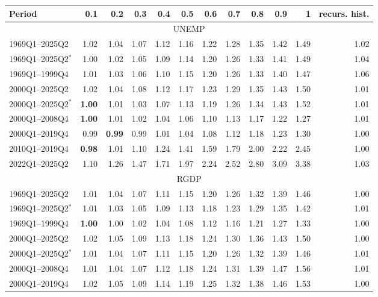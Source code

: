 \begin{tabular}{lrrrrrrrrrrr}
\hline
Period & 0.1 & 0.2 & 0.3 & 0.4 & 0.5 & 0.6 & 0.7 & 0.8 & 0.9 & 1 & recurs. hist. \\
\hline
\multicolumn{12}{c}{UNEMP} \\
1969Q1--2025Q2 & 1.02 & 1.04 & 1.07 & 1.12 & 1.16 & 1.22 & 1.28 & 1.35 & 1.42 & 1.49 & 1.02 \\
1969Q1--2025Q2$^*$ & 1.00 & 1.02 & 1.05 & 1.09 & 1.14 & 1.20 & 1.26 & 1.33 & 1.41 & 1.49 & 1.04 \\
1969Q1--1999Q4 & 1.01 & 1.03 & 1.06 & 1.10 & 1.15 & 1.20 & 1.26 & 1.33 & 1.40 & 1.47 & 1.06 \\
2000Q1--2025Q2 & 1.02 & 1.04 & 1.08 & 1.12 & 1.17 & 1.23 & 1.29 & 1.35 & 1.43 & 1.50 & 1.01 \\
2000Q1--2025Q2$^*$ & \textbf{1.00} & 1.01 & 1.03 & 1.07 & 1.13 & 1.19 & 1.26 & 1.34 & 1.43 & 1.52 & 1.01 \\
2000Q1--2008Q4 & \textbf{1.00} & 1.01 & 1.02 & 1.04 & 1.06 & 1.10 & 1.13 & 1.17 & 1.22 & 1.27 & 1.01 \\
2000Q1--2019Q4 & 0.99 & \textbf{0.99} & 0.99 & 1.01 & 1.04 & 1.08 & 1.12 & 1.18 & 1.23 & 1.30 & 1.00 \\
2010Q1--2019Q4 & \textbf{0.98} & 1.01 & 1.10 & 1.24 & 1.41 & 1.59 & 1.79 & 2.00 & 2.22 & 2.45 & 1.00 \\
2022Q1--2025Q2 & 1.10 & 1.26 & 1.47 & 1.71 & 1.97 & 2.24 & 2.52 & 2.80 & 3.09 & 3.38 & 1.03 \\
\hline
\multicolumn{12}{c}{RGDP} \\
1969Q1--2025Q2 & 1.01 & 1.04 & 1.07 & 1.11 & 1.15 & 1.20 & 1.26 & 1.32 & 1.39 & 1.46 & 1.00 \\
1969Q1--2025Q2$^*$ & 1.01 & 1.03 & 1.05 & 1.09 & 1.13 & 1.18 & 1.23 & 1.29 & 1.35 & 1.42 & 1.01 \\
1969Q1--1999Q4 & \textbf{1.00} & 1.00 & 1.02 & 1.04 & 1.08 & 1.12 & 1.16 & 1.21 & 1.27 & 1.33 & 1.00 \\
2000Q1--2025Q2 & 1.02 & 1.05 & 1.09 & 1.13 & 1.18 & 1.24 & 1.30 & 1.36 & 1.43 & 1.50 & 1.00 \\
2000Q1--2025Q2$^*$ & 1.01 & 1.04 & 1.07 & 1.11 & 1.15 & 1.20 & 1.26 & 1.32 & 1.39 & 1.46 & 1.01 \\
2000Q1--2008Q4 & 1.01 & 1.04 & 1.07 & 1.12 & 1.18 & 1.24 & 1.31 & 1.39 & 1.47 & 1.56 & 1.01 \\
2000Q1--2019Q4 & 1.02 & 1.05 & 1.09 & 1.14 & 1.19 & 1.25 & 1.32 & 1.38 & 1.46 & 1.53 & 1.00 \\

\end{tabular}
